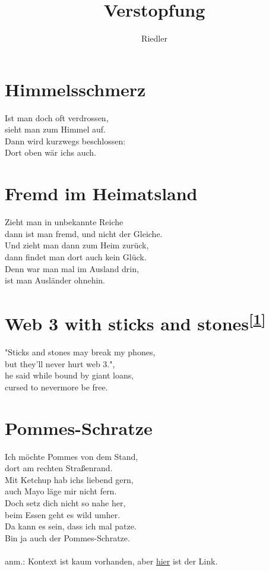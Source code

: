 \documentclass[11pt]{article}
\title{\textbf{Verstopfung}}
\author{Riedler}
\date{}
\begin{document}
\maketitle
\thispagestyle{empty}

\filbreak
\section*{Himmelsschmerz}

Ist man doch oft verdrossen,\\
sieht man zum Himmel auf.\\
Dann wird kurzwegs beschlossen:\\
Dort oben wär ichs auch.

\filbreak
\section*{Fremd im Heimatsland}

Zieht man in unbekannte Reiche\\
dann ist man fremd, und nicht der Gleiche.\\
Und zieht man dann zum Heim zurück,\\
dann findet man dort auch kein Glück.\\
Denn war man mal im Ausland drin,\\
ist man Ausländer ohnehin.

\filbreak
\section*{Web 3 with sticks and stones\textsuperscript{[\href{https://mas.to/@Riedler/109154135549306406}{1}]}}
"Sticks and stones may break my phones,\\
but they'll never hurt web 3.",\\
he said while bound by giant loans,\\
cursed to nevermore be free.

\filbreak
\section*{Pommes-Schratze}

Ich möchte Pommes von dem Stand,\\
dort am rechten Straßenrand.\\
Mit Ketchup hab ichs liebend gern,\\
auch Mayo läge mir nicht fern.\\
Doch setz dich nicht so nahe her,\\
beim Essen geht es wild umher.\\
Da kann es sein, dass ich mal patze.\\
Bin ja auch der Pommes-Schratze.\\
\\
anm.: Kontext ist kaum vorhanden, aber \href{https://mas.to/@Riedler/108709490168652329}{hier} ist der Link.
\end{document}
